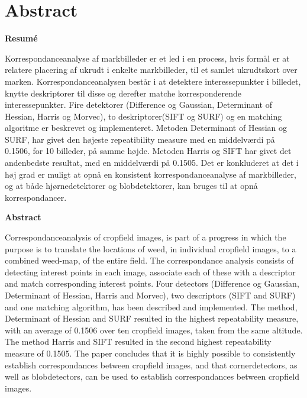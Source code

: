 \chapter{Abstract} \label{sec:abstract}
\vspace{2cm}
\begin{center}
\textbf{Resumé}
\end{center}
Korrespondanceanalyse af markbilleder er et led i en process, hvis formål er at relatere placering af ukrudt i enkelte markbilleder,
til et samlet ukrudtskort over marken. Korrespondanceanalysen består i at detektere interessepunkter i billedet, knytte deskriptorer til disse og derefter matche korresponderende interessepunkter. Fire detektorer (Difference og Gaussian, Determinant of Hessian, Harris og Morvec), to deskriptorer(SIFT og SURF) og en matching algoritme er beskrevet og implementeret. Metoden Determinant of Hessian og SURF, har givet den højeste repeatibility measure med en middelværdi på 0.1506, for 10 billeder, på samme højde. Metoden Harris og SIFT har givet det andenbedste resultat, med en middelværdi på 0.1505. Det er konkluderet at det i høj grad er muligt at opnå en konsistent korrespondanceanalyse af markbilleder, og at både hjørnedetektorer og blobdetektorer, kan bruges til at opnå korrespondancer.
\vspace{2cm}
\begin{center}
\textbf{Abstract}
\end{center}
Correspondanceanalysis of cropfield images, is part of a progress in which the purpose is to translate the locations of weed, in individual cropfield images, to a combined weed-map, of the entire field. The correspondance analysis consists of detecting interest points in each image, associate each of these with a descriptor and match corresponding interest points. Four detectors (Difference og Gaussian, Determinant of Hessian, Harris and Morvec), two descriptors (SIFT and SURF) and one matching algorithm, has been described and implemented. The method, Determinant of Hessian and SURF resulted in the highest repeatability measure, with an average of 0.1506 over ten cropfield images, taken from the same altitude. The method Harris and SIFT resulted in the second highest repeatability measure of 0.1505. The paper concludes that it is highly possible to consistently establish correspondances between cropfield images, and that cornerdetectors, as well as blobdetectors, can be used to establish correspondances between cropfield images.